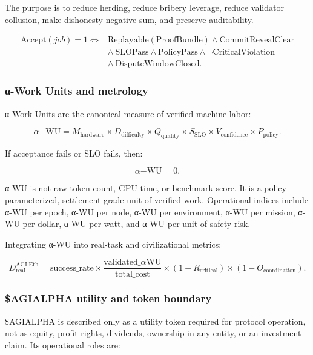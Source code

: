 The purpose is to reduce herding, reduce bribery leverage, reduce
validator collusion, make dishonesty negative-sum, and preserve
auditability.

\[
\begin{aligned}
\mathrm{Accept}(job)=1 \iff {}&
\mathrm{Replayable}(\mathrm{ProofBundle})
\land \mathrm{CommitRevealClear} \\
&\land\ \mathrm{SLOPass}
\land \mathrm{PolicyPass}
\land \neg\mathrm{CriticalViolation} \\
&\land\ \mathrm{DisputeWindowClosed}.
\end{aligned}
\]

\subsubsection{α-Work Units and
metrology}\label{ux3b1-work-units-and-metrology}

α-Work Units are the canonical measure of verified machine labor:

\[
\alpha\mathrm{-WU}
=
M_{\mathrm{hardware}}
\times
D_{\mathrm{difficulty}}
\times
Q_{\mathrm{quality}}
\times
S_{\mathrm{SLO}}
\times
V_{\mathrm{confidence}}
\times
P_{\mathrm{policy}}.
\]

If acceptance fails or SLO fails, then:

\[
\alpha\mathrm{-WU}=0.
\]

α-WU is not raw token count, GPU time, or benchmark score. It is a
policy-parameterized, settlement-grade unit of verified work.
Operational indices include α-WU per epoch, α-WU per node, α-WU per
environment, α-WU per mission, α-WU per dollar, α-WU per watt, and α-WU
per unit of safety risk.

Integrating α-WU into real-task and civilizational metrics:

\[
D_{\mathrm{real}}^{\mathrm{AGI.Eth}}
=
\mathrm{success\_rate}
\times
\frac{\mathrm{validated\_}\alpha\mathrm{WU}}{\mathrm{total\_cost}}
\times
(1-R_{\mathrm{critical}})
\times
(1-O_{\mathrm{coordination}}).
\]

\subsubsection{\$AGIALPHA utility and token
boundary}\label{agialpha-utility-and-token-boundary}

\$AGIALPHA is described only as a utility token required for protocol
operation, not as equity, profit rights, dividends, ownership in any
entity, or an investment claim. Its operational roles are:

